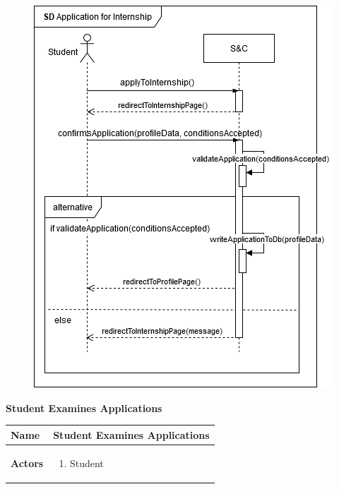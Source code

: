 \begin{enumerate}[label=\textbf{[US\arabic*]}, left = 0pt, align = left, resume]
            \newpage
            \begin{figure}[h!]
                \centering   \includegraphics[width=1\textwidth]{RASD/Images/UseCases/US06_InternshipApplication.drawio.png}
                \label{fig: Application for Internship}
            \end{figure}

            \newpage
            \item \textbf{Student Examines Applications} 
            \begin{longtable}{|l|p{11cm}|}  
                \hline
                \textbf{Name} & 
                    \textbf{Student Examines Applications} \\
                \hline
                
                \textbf{Actors} & 
                    \begin{enumerate}[label=\textbullet, itemsep=0em]
                        \item Student
                    \end{enumerate} \\
                \hline
                

\end{longtable}
\end{enumerate}

